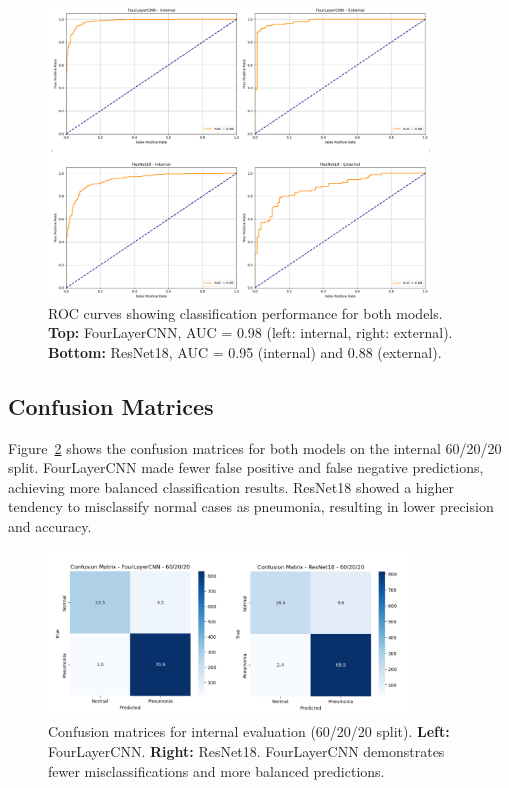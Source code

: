 \documentclass[a4paper,11pt]{article}
\begin{document}
\begin{figure}[H]
    \centering
    \includegraphics[width=0.90\textwidth]{./Figures/2.png} %
    \caption[ROC curves for FourLayerCNN and ResNet18]{
        ROC curves showing classification performance for both models. \textbf{Top:} FourLayerCNN, AUC = 0.98 (left: internal, right: external). \textbf{Bottom:} ResNet18, AUC = 0.95 (internal) and 0.88 (external).
    }
    \label{fig:roc}
\end{figure}

\subsection{Confusion Matrices}

Figure~\ref{fig:confusion} shows the confusion matrices for both models on the internal 60/20/20 split. FourLayerCNN made fewer false positive and false negative predictions, achieving more balanced classification results. ResNet18 showed a higher tendency to misclassify normal cases as pneumonia, resulting in lower precision and accuracy.

\begin{figure}[H]
    \centering
    \includegraphics[width=0.85\textwidth]{./Figures/3.png} %
    \caption[Confusion matrices of FourLayerCNN and ResNet18 models]{
        Confusion matrices for internal evaluation (60/20/20 split). \textbf{Left:} FourLayerCNN. \textbf{Right:} ResNet18. FourLayerCNN demonstrates fewer misclassifications and more balanced predictions.
    }
    \label{fig:confusion}
\end{figure}
\end{document}
